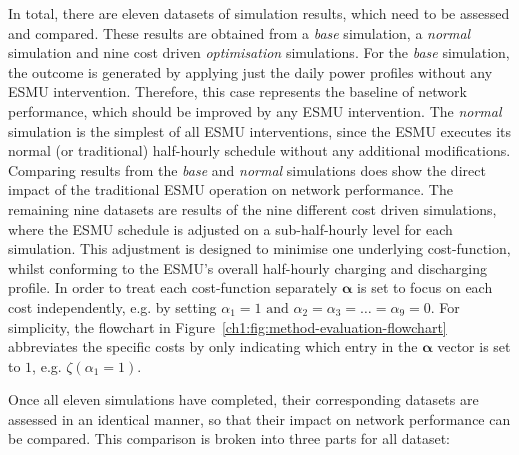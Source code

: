 

In total, there are eleven datasets of simulation results, which need to be assessed and compared.
These results are obtained from a \textit{base} simulation, a \textit{normal} simulation and nine cost driven \textit{optimisation} simulations.
For the \textit{base} simulation, the outcome is generated by applying just the daily power profiles without any ESMU intervention.
Therefore, this case represents the baseline of network performance, which should be improved by any ESMU intervention.
The \textit{normal} simulation is the simplest of all ESMU interventions, since the ESMU executes its normal (or traditional) half-hourly schedule without any additional modifications.
Comparing results from the \textit{base} and \textit{normal} simulations does show the direct impact of the traditional ESMU operation on network performance.
The remaining nine datasets are results of the nine different cost driven simulations, where the ESMU schedule is adjusted on a sub-half-hourly level for each simulation.
This adjustment is designed to minimise one underlying cost-function, whilst conforming to the ESMU's overall half-hourly charging and discharging profile.
In order to treat each cost-function separately $\boldsymbol{\alpha}$ is set to focus on each cost independently, e.g. by setting $\alpha_1 = 1 \text{ and } \alpha_2 = \alpha_3 = \dots = \alpha_9 = 0$.
For simplicity, the flowchart in Figure~\ref{ch1:fig:method-evaluation-flowchart} abbreviates the specific costs by only indicating which entry in the $\boldsymbol{\alpha}$ vector is set to $1$, e.g. $\zeta(\alpha_1=1)$.

Once all eleven simulations have completed, their corresponding datasets are assessed in an identical manner, so that their impact on network performance can be compared.
This comparison is broken into three parts for all dataset:

